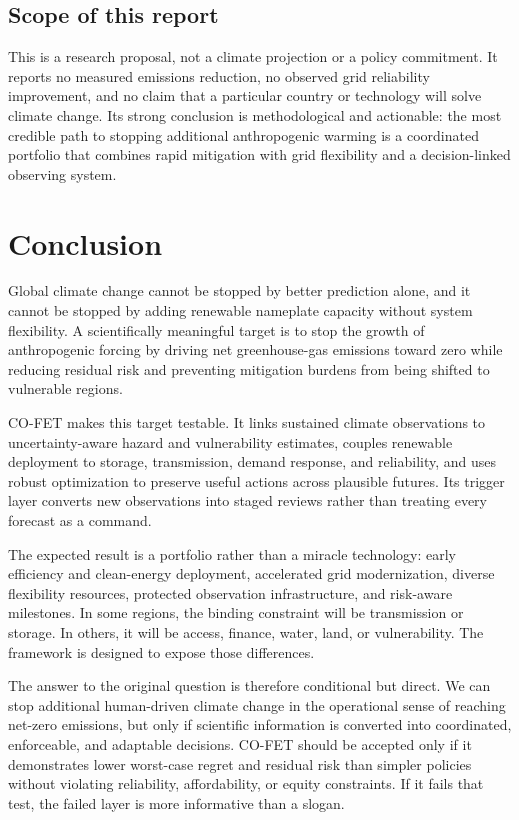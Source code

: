 \documentclass[conference]{IEEEtran}
\begin{document}
\subsection{Scope of this report}
This is a research proposal, not a climate projection or a policy commitment. It reports no measured emissions reduction, no observed grid reliability improvement, and no claim that a particular country or technology will solve climate change. Its strong conclusion is methodological and actionable: the most credible path to stopping additional anthropogenic warming is a coordinated portfolio that combines rapid mitigation with grid flexibility and a decision-linked observing system.

\section{Conclusion}
Global climate change cannot be stopped by better prediction alone, and it cannot be stopped by adding renewable nameplate capacity without system flexibility. A scientifically meaningful target is to stop the growth of anthropogenic forcing by driving net greenhouse-gas emissions toward zero while reducing residual risk and preventing mitigation burdens from being shifted to vulnerable regions.

CO-FET makes this target testable. It links sustained climate observations to uncertainty-aware hazard and vulnerability estimates, couples renewable deployment to storage, transmission, demand response, and reliability, and uses robust optimization to preserve useful actions across plausible futures. Its trigger layer converts new observations into staged reviews rather than treating every forecast as a command.

The expected result is a portfolio rather than a miracle technology: early efficiency and clean-energy deployment, accelerated grid modernization, diverse flexibility resources, protected observation infrastructure, and risk-aware milestones. In some regions, the binding constraint will be transmission or storage. In others, it will be access, finance, water, land, or vulnerability. The framework is designed to expose those differences.

The answer to the original question is therefore conditional but direct. We can stop additional human-driven climate change in the operational sense of reaching net-zero emissions, but only if scientific information is converted into coordinated, enforceable, and adaptable decisions. CO-FET should be accepted only if it demonstrates lower worst-case regret and residual risk than simpler policies without violating reliability, affordability, or equity constraints. If it fails that test, the failed layer is more informative than a slogan.
\end{document}

